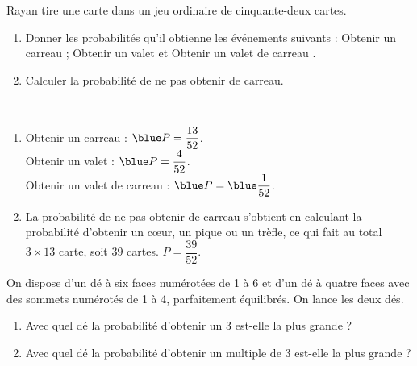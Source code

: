 \begin{colonne*exercice}
\smallskip


\begin{exercice} %
   Rayan tire une carte dans un jeu ordinaire de cinquante-deux cartes.
   \begin{enumerate}
      \item Donner les probabilités qu'il obtienne les événements suivants : \og Obtenir un carreau \fg ; \og Obtenir un valet \fg{} et \og Obtenir un valet de carreau \fg.
      \item Calculer la probabilité de ne pas obtenir de carreau.
   \end{enumerate}
\end{exercice}

\begin{corrige}
   \ \\ [-5mm]
   \begin{enumerate}
      \item Obtenir un carreau : ${\blue P =\dfrac{13}{52}}$. \\
         Obtenir un valet : ${\blue P =\dfrac{4}{52}}$. \\
         Obtenir un valet de carreau  : ${\blue P =\blue \dfrac{1}{52}}$. \smallskip
      \item La probabilité de ne pas obtenir de carreau s'obtient en calculant la probabilité d'obtenir un c\oe ur, un pique ou un trèfle, ce qui fait au total $3\times13$ carte, soit 39 cartes. {\blue $P =\dfrac{39}{52}$}.
   \end{enumerate}      
\end{corrige}

\bigskip


\begin{exercice} %
   On dispose d’un dé à six faces numérotées de 1 à 6 et d’un dé à quatre faces avec des sommets numérotés de 1 à 4, parfaitement équilibrés. On lance les deux dés.
   \begin{enumerate}
      \item Avec quel dé la probabilité d’obtenir un 3 est-elle la plus
grande ?
      \item Avec quel dé la probabilité d’obtenir un multiple de 3 est-elle la plus grande ?
   \end{enumerate}
\end{exercice}


\end{colonne*exercice}
